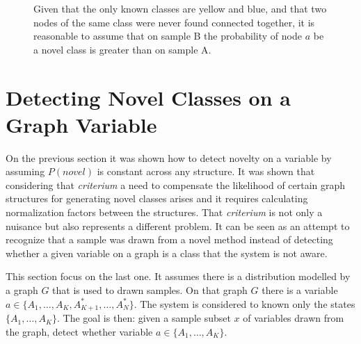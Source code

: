 \begin{figure}[h]
{}

\qquad
{}

\caption{\label{fig:structure-influences-novelty}Given that the only known
         classes are yellow and blue, and that two nodes of the same class
         were never found connected together, it is reasonable to assume
         that on sample B the probability of node $a$
         be a novel class is greater than on sample A.}
\end{figure}



\section{Detecting Novel Classes on a Graph Variable}
On the previous section it was shown how to detect novelty on a variable
by assuming $P(novel)$ is constant across any structure. It was shown that
considering that \emph{criterium} a need to compensate the likelihood of
certain graph structures for generating novel classes arises and it requires
calculating normalization factors between the structures.
That \emph{criterium} is not only a nuisance but also represents
a different problem. It can be seen as an attempt to recognize that a sample
was drawn from a novel method instead of detecting whether a given variable on
a graph is a class that the system is not aware.

This section focus on the last one. It assumes there is a distribution modelled
by a graph $G$ that is used to drawn samples. On that graph $G$ there is a
variable $a \in \{A_1,\dotsc, A_K, A^*_{K+1},\dotsc, A^*_N\}$. The system is considered
to known only the states $\{A_1,\dotsc, A_K\}$. The goal is then: given a sample subset
$x$ of variables drawn from the graph, detect whether variable
$a \in \{A_1,\dotsc, A_K\}$.

